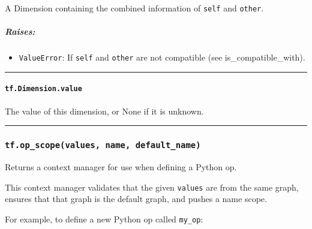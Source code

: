 A Dimension containing the combined information of \lstinline{self} and
\lstinline{other}.

\subparagraph{Raises: }\label{raises-26}

\begin{itemize}
\tightlist
\item
  \lstinline{ValueError}: If \lstinline{self} and \lstinline{other} are not
  compatible (see is_compatible_with).
\end{itemize}

\begin{center}\rule{0.5\linewidth}{\linethickness}\end{center}

\paragraph{\texorpdfstring{\lstinline{tf.Dimension.value}
}{tf.Dimension.value }}\label{tf.dimension.value}

The value of this dimension, or None if it is unknown.

\begin{center}\rule{0.5\linewidth}{\linethickness}\end{center}

\subsubsection{\texorpdfstring{\lstinline{tf.op_scope(values, name, default_name)}
}{tf.op_scope(values, name, default_name) }}\label{tf.opux5fscopevalues-name-defaultux5fname}

Returns a context manager for use when defining a Python op.

This context manager validates that the given \lstinline{values} are from
the same graph, ensures that that graph is the default graph, and pushes
a name scope.

For example, to define a new Python op called \lstinline{my_op}:

\begin{Shaded}
\begin{Highlighting}[]
 \OperatorTok{=}\NormalTok{):}
   \NormalTok{) } 
    \OperatorTok{=} \OperatorTok{=}\NormalTok{)}
    \OperatorTok{=} \OperatorTok{=}\NormalTok{)}
    \OperatorTok{=} \OperatorTok{=}\NormalTok{)}
     \OperatorTok{=}
\end{Highlighting}
\end{Shaded}

